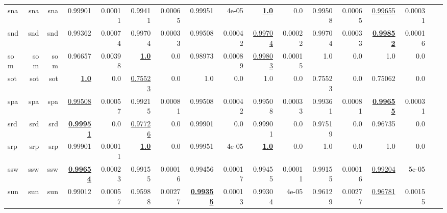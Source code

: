 \documentclass[11pt]{article}
\begin{document}
\begin{table*}[h]
{\begin{tabular}{lrrrrrrrrrrrrrrrr}
sna         & sna         & sna         & 0.99901         & 0.00011         & 0.99411         & 0.00065         & 0.99951         & 4e-05         & \textbf{\underline{1.0}}         & 0.0         & 0.99508         & 0.00065         & \underline{0.99655}         & 0.00031         \\
snd         & snd         & snd         & 0.99362         & 0.00074         & 0.99704         & 0.00033         & 0.99508         & 0.00042         & \underline{0.99704}         & 0.00022         & 0.99704         & 0.00033         & \textbf{\underline{0.99852}}         & 0.00016         \\
som         & som         & som         & 0.96657         & 0.00398         & \textbf{\underline{1.0}}         & 0.0         & 0.98973         & 0.00089         & \underline{0.99803}         & 0.00015         & 1.0         & 0.0         & 1.0         & 0.0         \\
sot         & sot         & sot         & \textbf{\underline{1.0}}         & 0.0         & \underline{0.75523}         & 0.0         & 1.0         & 0.0         & 1.0         & 0.0         & 0.75523         & 0.0         & 0.75062         & 0.0         \\
spa         & spa         & spa         & \underline{0.99508}         & 0.00057         & 0.99215         & 0.00081         & 0.99508         & 0.00042         & 0.99508         & 0.00033         & 0.99361         & 0.00081         & \textbf{\underline{0.99655}}         & 0.00031         \\
srd         & srd         & srd         & \textbf{\underline{0.99951}}         & 0.0         & \underline{0.97726}         & 0.0         & 0.99901         & 0.0         & 0.99901         & 0.0         & 0.97519         & 0.0         & 0.96735         & 0.0         \\
srp         & srp         & srp         & 0.99901         & 0.00011         & \textbf{\underline{1.0}}         & 0.0         & 0.99951         & 4e-05         & \textbf{\underline{1.0}}         & 0.0         & 1.0         & 0.0         & 1.0         & 0.0         \\
ssw         & ssw         & ssw         & \textbf{\underline{0.99654}}         & 0.00023         & 0.99155         & 0.00016         & 0.99456         & 0.00017         & 0.99455         & 0.00011         & 0.99155         & 0.00016         & \underline{0.99204}         & 5e-05         \\
sun         & sun         & sun         & 0.99012         & 0.00057         & 0.95988         & 0.00277         & \textbf{\underline{0.99355}}         & 0.00013         & 0.99304         & 4e-05         & 0.96129         & 0.00277         & \underline{0.96781}         & 0.00155         \\

\end{tabular}}
\end{table*}
\end{document}
